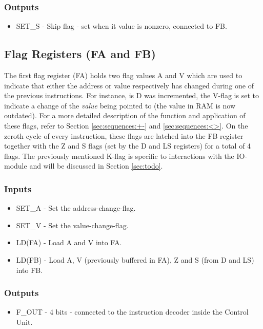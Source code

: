 \subsubsection*{Outputs}
\begin{itemize}
\itemsep0em 
\item SET\_S - Skip flag - set when it value is nonzero, connected to FB.
\end{itemize}

\subsection{Flag Registers (FA and FB)} \label{sec:architecture:flags}
The first flag register (FA) holds two flag values A and V which are used to indicate that either the address or value respectively has changed during one of the previous instructions. For instance, is D was incremented, the V-flag is set to indicate a change of the \emph{value} being pointed to (the value in RAM is now outdated). For a more detailed description of the function and application of these flags, refer to Section \ref{sec:sequences:+-} and \ref{sec:sequences:<>}. On the zeroth cycle of every instruction, these flags are latched into the FB register together with the Z and S flags (set by the D and LS registers) for a total of 4 flags. The previously mentioned K-flag is specific to interactions with the IO-module and will be discussed in Section \ref{sec:todo}.

\subsubsection*{Inputs}
\begin{itemize}
\itemsep0em 
\item SET\_A - Set the address-change-flag.
\item SET\_V - Set the value-change-flag.
\item LD(FA) - Load A and V into FA.
\item LD(FB) - Load A, V (previously buffered in FA), Z and S (from D and LS) into FB. 
\end{itemize}

\subsubsection*{Outputs}
\begin{itemize}
\itemsep0em 
\item F\_OUT - 4 bits - connected to the instruction decoder inside the Control Unit.
\end{itemize}


